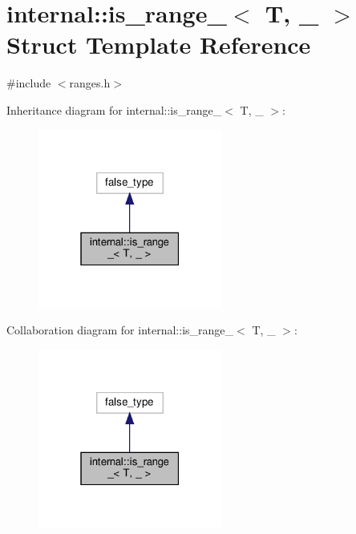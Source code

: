 \hypertarget{structinternal_1_1is__range__}{}\section{internal\+:\+:is\+\_\+range\+\_\+$<$ T, \+\_\+ $>$ Struct Template Reference}
\label{structinternal_1_1is__range__}


{\ttfamily \#include $<$ranges.\+h$>$}



Inheritance diagram for internal\+:\+:is\+\_\+range\+\_\+$<$ T, \+\_\+ $>$\+:
\nopagebreak
\begin{figure}[H]
\begin{center}
\leavevmode
\includegraphics[width=171pt]{structinternal_1_1is__range____inherit__graph}
\end{center}
\end{figure}


Collaboration diagram for internal\+:\+:is\+\_\+range\+\_\+$<$ T, \+\_\+ $>$\+:
\nopagebreak
\begin{figure}[H]
\begin{center}
\leavevmode
\includegraphics[width=171pt]{structinternal_1_1is__range____coll__graph}
\end{center}
\end{figure}


